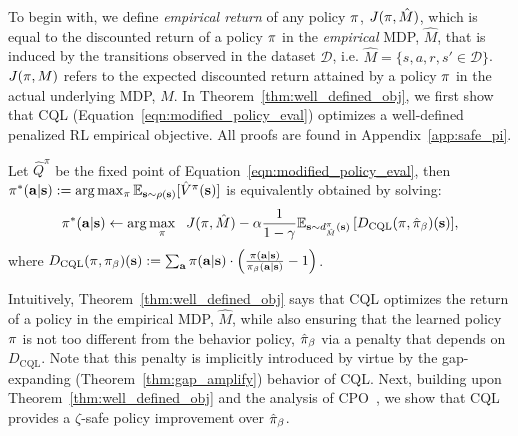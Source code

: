 To begin with, we define \emph{empirical return} of any policy $\pi$, ${J}(\pi, \hat{M})$, which is equal to the discounted return of a policy $\pi$ in the \emph{empirical} MDP, $\hat{M}$, that is induced by the transitions observed in the dataset $\mathcal{D}$, i.e. $\hat{M} = \{s, a, r, s' \in \mathcal{D}\}$. $J(\pi, M)$ refers to the expected discounted return attained by a policy $\pi$ in the actual underlying MDP, $M$. In Theorem~\ref{thm:well_defined_obj}, we first show that CQL (Equation~\ref{eqn:modified_policy_eval}) optimizes a well-defined penalized RL empirical objective. All proofs are found in Appendix~\ref{app:safe_pi}. 

\begin{theorem}
\label{thm:well_defined_obj}
Let $\hat{Q}^\pi$ be the fixed point of Equation~\ref{eqn:modified_policy_eval}, then $\pi^*(\mathbf{a}|\mathbf{s}) := \arg\max_{\pi} \mathbb{E}_{\mathbf{s} \sim \rho(\mathbf{s})}[\hat{V}^\pi(\mathbf{s})]$ is equivalently obtained by solving:
\begin{equation}
\label{eqn:policy_optimality_main}
    \small{\pi^*(\mathbf{a}|\mathbf{s}) \leftarrow \arg \max_{\pi}~~ J(\pi, \hat{M}) - \alpha \frac{1}{1 - \gamma} \mathbb{E}_{\mathbf{s}\sim d^\pi_{\hat{M}}(\mathbf{s})}\left[D_{\text{CQL}}(\pi, \hat{\pi}_\beta)(\mathbf{s}) \right]},
\end{equation}
where $D_{\text{CQL}}(\pi, {\pi_\beta})(\mathbf{s}) := \sum_{\mathbf{a}} \pi(\mathbf{a}|\mathbf{s}) \cdot \left(\frac{\pi(\mathbf{a}|\mathbf{s})}{{\pi_\beta}(\mathbf{a}|\mathbf{s})} - 1 \right)$.
\end{theorem}
Intuitively, Theorem~\ref{thm:well_defined_obj} says that CQL optimizes the return of a policy in the empirical MDP, $\hat{M}$, while also ensuring that the learned policy $\pi$ is not too different from the behavior policy, $\hat{\pi}_\beta$ via a penalty that depends on $D_{\text{CQL}}$. Note that this penalty is implicitly introduced by virtue by the gap-expanding (Theorem~\ref{thm:gap_amplify}) behavior of CQL. Next, building upon Theorem~\ref{thm:well_defined_obj} and the analysis of CPO~\citep{achiam2017constrained}, we show that CQL provides a $\zeta$-safe policy improvement over $\hat{\pi}_\beta$.   

